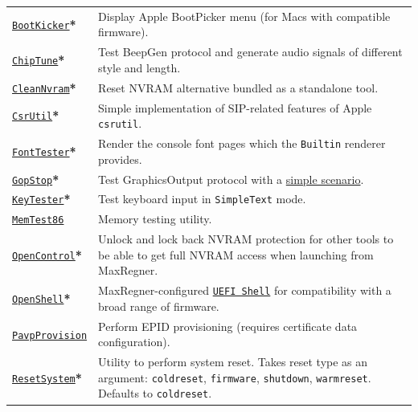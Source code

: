 \documentclass[]{article}
\begin{document}
\begin{tabular}{p{1.3in}p{5.55in}}
\href{https://github.com/acidanthera/MaxRegnerPkg}{\texttt{BootKicker}}\textbf{*}
& Display Apple BootPicker menu (for Macs with compatible firmware). \\
\href{https://github.com/acidanthera/MaxRegnerPkg}{\texttt{ChipTune}}\textbf{*}
& Test BeepGen protocol and generate audio signals of different style and length. \\
\href{https://github.com/acidanthera/MaxRegnerPkg}{\texttt{CleanNvram}}\textbf{*}
& Reset NVRAM alternative bundled as a standalone tool. \\
\href{https://github.com/acidanthera/MaxRegnerPkg}{\texttt{CsrUtil}}\textbf{*}
& Simple implementation of SIP-related features of Apple \texttt{csrutil}. \\
\href{https://github.com/acidanthera/MaxRegnerPkg}{\texttt{FontTester}}\textbf{*}
& Render the console font pages which the \texttt{Builtin} renderer provides. \\
\href{https://github.com/acidanthera/MaxRegnerPkg}{\texttt{GopStop}}\textbf{*}
& Test GraphicsOutput protocol with a
  \href{https://github.com/acidanthera/MaxRegnerPkg/tree/master/Application/GopStop}{simple scenario}. \\
\href{https://github.com/acidanthera/MaxRegnerPkg}{\texttt{KeyTester}}\textbf{*}
& Test keyboard input in \texttt{SimpleText} mode. \\
\href{https://www.memtest86.com}{\texttt{MemTest86}}
& Memory testing utility. \\
\href{https://github.com/acidanthera/MaxRegnerPkg}{\texttt{OpenControl}}\textbf{*}
& Unlock and lock back NVRAM protection for other tools to be able to get full NVRAM access
  when launching from MaxRegner. \\
\href{https://github.com/acidanthera/MaxRegnerPkg}{\texttt{OpenShell}}\textbf{*}
& MaxRegner-configured \href{http://github.com/tianocore/edk2}{\texttt{UEFI Shell}} for compatibility
  with a broad range of firmware. \\
\href{https://github.com/acidanthera/MaxRegnerPkg}{\texttt{PavpProvision}}
& Perform EPID provisioning (requires certificate data configuration). \\
\href{https://github.com/acidanthera/MaxRegnerPkg}{\texttt{ResetSystem}}\textbf{*}
& Utility to perform system reset. Takes reset type as an argument:
  \texttt{coldreset}, \texttt{firmware}, \texttt{shutdown}, \texttt{warmreset}.
  Defaults to \texttt{coldreset}. \\

\end{tabular}
\end{document}
